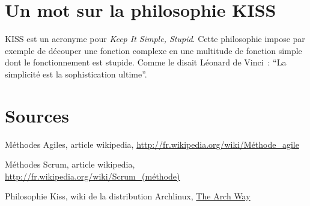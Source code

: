 \documentclass[a4paper,10pt]{article}
\begin{document}
\section{Un mot sur la philosophie KISS}
\label{Kiss}

KISS est un acronyme pour \textit{Keep It Simple, Stupid}. Cette philosophie
impose par exemple de découper une fonction complexe en une multitude de 
fonction simple dont le fonctionnement est stupide. Comme le disait 
Léonard de Vinci~: ``La simplicité est la sophistication ultime''.

\section*{Sources}

Méthodes Agiles, article wikipedia, 
\href{http://fr.wikipedia.org/wiki/M%C3%A9thode_agile}
{http://fr.wikipedia.org/wiki/Méthode\_agile}

Méthodes Scrum, article wikipedia,
\href{http://fr.wikipedia.org/wiki/Scrum_(m%C3%A9thode)}
{http://fr.wikipedia.org/wiki/Scrum\_(méthode)}

Philosophie Kiss, wiki de la distribution Archlinux,
\href{http://wiki.archlinux.org/index.php/The_Arch_Way}{The Arch Way}
\end{document}
